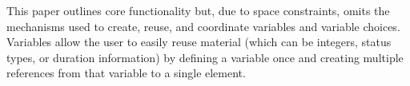 \documentclass[runningheads,a4paper]{llncs}
\begin{document}
This paper outlines core functionality but, due to space constraints, omits the mechanisms used to create, reuse, and coordinate variables and variable choices. Variables allow the user to easily reuse material (which can be integers, status types, or duration information) by defining a variable once and creating multiple references from that variable to a single element.



 

 
\end{document}
